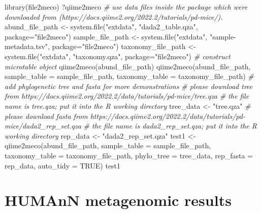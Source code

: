 \documentclass[
]{book}
\newenvironment{Shaded}{\begin{snugshade}}{\end{snugshade}}
\newcommand{\AttributeTok}[1]{\textcolor[rgb]{0.77,0.63,0.00}{#1}}
\newcommand{\CommentTok}[1]{\textcolor[rgb]{0.56,0.35,0.01}{\textit{#1}}}
\newcommand{\ConstantTok}[1]{\textcolor[rgb]{0.00,0.00,0.00}{#1}}
\newcommand{\FunctionTok}[1]{\textcolor[rgb]{0.00,0.00,0.00}{#1}}
\newcommand{\NormalTok}[1]{#1}
\newcommand{\OtherTok}[1]{\textcolor[rgb]{0.56,0.35,0.01}{#1}}
\newcommand{\StringTok}[1]{\textcolor[rgb]{0.31,0.60,0.02}{#1}}
\begin{document}
\begin{Shaded}
\begin{Highlighting}[]
\FunctionTok{library}\NormalTok{(file2meco)}
\NormalTok{?qiime2meco}
\CommentTok{\# use data files inside the package which were downloaded from (https://docs.qiime2.org/2022.2/tutorials/pd{-}mice/).}
\NormalTok{abund\_file\_path }\OtherTok{\textless{}{-}} \FunctionTok{system.file}\NormalTok{(}\StringTok{"extdata"}\NormalTok{, }\StringTok{"dada2\_table.qza"}\NormalTok{, }\AttributeTok{package=}\StringTok{"file2meco"}\NormalTok{)}
\NormalTok{sample\_file\_path }\OtherTok{\textless{}{-}} \FunctionTok{system.file}\NormalTok{(}\StringTok{"extdata"}\NormalTok{, }\StringTok{"sample{-}metadata.tsv"}\NormalTok{, }\AttributeTok{package=}\StringTok{"file2meco"}\NormalTok{)}
\NormalTok{taxonomy\_file\_path }\OtherTok{\textless{}{-}} \FunctionTok{system.file}\NormalTok{(}\StringTok{"extdata"}\NormalTok{, }\StringTok{"taxonomy.qza"}\NormalTok{, }\AttributeTok{package=}\StringTok{"file2meco"}\NormalTok{)}
\CommentTok{\# construct microtable object}
\FunctionTok{qiime2meco}\NormalTok{(abund\_file\_path)}
\FunctionTok{qiime2meco}\NormalTok{(abund\_file\_path, }\AttributeTok{sample\_table =}\NormalTok{ sample\_file\_path, }\AttributeTok{taxonomy\_table =}\NormalTok{ taxonomy\_file\_path)}
\CommentTok{\# add phylogenetic tree and fasta for more demonstrations}
\CommentTok{\# please download tree from https://docs.qiime2.org/2022.2/data/tutorials/pd{-}mice/tree.qza}
\CommentTok{\# the file name is \textquotesingle{}tree.qza\textquotesingle{}; put it into the R working directory}
\NormalTok{tree\_data }\OtherTok{\textless{}{-}} \StringTok{"tree.qza"}
\CommentTok{\# please download fasta from https://docs.qiime2.org/2022.2/data/tutorials/pd{-}mice/dada2\_rep\_set.qza}
\CommentTok{\# the file name is \textquotesingle{}dada2\_rep\_set.qza\textquotesingle{}; put it into the R working directory}
\NormalTok{rep\_data }\OtherTok{\textless{}{-}} \StringTok{"dada2\_rep\_set.qza"}
\NormalTok{test1 }\OtherTok{\textless{}{-}} \FunctionTok{qiime2meco}\NormalTok{(abund\_file\_path, }\AttributeTok{sample\_table =}\NormalTok{ sample\_file\_path, }\AttributeTok{taxonomy\_table =}\NormalTok{ taxonomy\_file\_path, }\AttributeTok{phylo\_tree =}\NormalTok{ tree\_data, }\AttributeTok{rep\_fasta =}\NormalTok{ rep\_data, }\AttributeTok{auto\_tidy =} \ConstantTok{TRUE}\NormalTok{)}
\NormalTok{test1}
\end{Highlighting}
\end{Shaded}

\hypertarget{humann-metagenomic-results}{%
\section{HUMAnN metagenomic results}\label{humann-metagenomic-results}}
\end{document}

